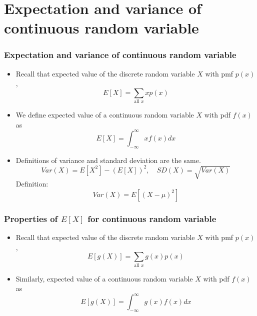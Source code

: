 \documentclass[slidestop,compress,mathserif]{beamer}
\begin{document}
\section{Expectation and variance of continuous random variable}
\begin{frame}\frametitle{Expectation and variance of continuous random variable}

\begin{itemize}
\item Recall that expected value of the discrete random variable $X$ with pmf $p(x)$,
\[E[X] = \sum_{\text{all } x} x p(x)\]

\pause
\item We define expected value of a continuous random variable $X$ with pdf $f(x)$ as
\[E[X] = \int_{-\infty}^{\infty} x f(x) dx\]

\pause
\item Definitions of variance and standard deviation are the same.
\[Var(X) = E[X^2] - (E[X])^2, \quad SD(X) = \sqrt{Var{(X)}}  \]
Definition: \[Var(X) = E[(X-\mu)^2] \] 
\end{itemize}

\end{frame}


\begin{frame}\frametitle{Properties of $E[X]$ for continuous random variable}

\begin{itemize}
\item Recall that expected value of the discrete random variable $X$ with pmf $p(x)$,
\[E[g(X)] = \sum_{\text{all } x} g(x) p(x)\]

\pause
\item Similarly, expected value of a continuous random variable $X$ with pdf $f(x)$ as
\[E[g(X)] = \int_{-\infty}^{\infty} g(x) f(x) dx\]

%
\end{itemize}


\end{frame}
\end{document}
